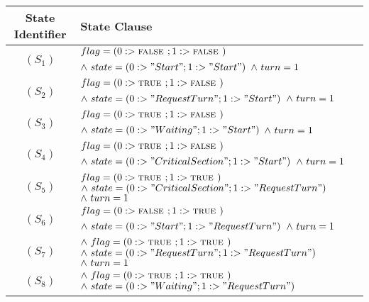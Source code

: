 \documentclass[fleqn]{tukseminar}
\begin{document}
				\begin{center}
					\begin{longtable}{ |c|p{10cm}| } 
						\hline
						\textbf{State Identifier} & \textbf{State Clause} \\
						\hline 
						\endhead
							\pa $(S_1)$  & $flag = (0 :> \mbox{\textsc{false }}  ;  1 :> \mbox{\textsc{false }})$\newline
													$\land \  state = (0 :> "Start"  ;  1 :> "Start")$\newline
													$\land \  turn = 1$\\
							\hline
							\pa $(S_2)$   & $flag = (0 :> \mbox{\textsc{true }}  ;  1 :> \mbox{\textsc{false }})$\newline
													$\land \  state = (0 :> "RequestTurn"  ;  1 :> "Start")$\newline
													$\land \  turn = 1$  \\ \hline
							\pa $(S_3)$   & $flag = (0 :> \mbox{\textsc{true }}  ;  1 :> \mbox{\textsc{false }})$\newline
													$\land \  state = (0 :> "Waiting"  ;  1 :> "Start")$\newline
													$\land \  turn = 1$  \\ \hline
							\pa $(S_4)$   & $ flag = (0 :> \mbox{\textsc{true }} ; 1 :> \mbox{\textsc{false }})$\newline
													$\land \  state = (0 :> "CriticalSection" ; 1 :> "Start")$\newline
													$\land \  turn = 1$  \\ \hline
							\pa $(S_5)$   & $ flag = (0 :> \mbox{\textsc{true }} ; 1 :> \mbox{\textsc{true }})$\newline
													$\land \  state = (0 :> "CriticalSection" ; 1 :> "RequestTurn")$\newline
													$\land \  turn = 1$  \\ \hline
							\pa $(S_6)$   & $ flag = (0 :> \mbox{\textsc{false }} ; 1 :> \mbox{\textsc{true }})$\newline
													$\land \  state = (0 :> "Start" ; 1 :> "RequestTurn")$\newline
													$\land \  turn = 1$  \\ \hline
							\pa $(S_7)$   & $\land \  flag = (0 :> \mbox{\textsc{true }} ; 1 :> \mbox{\textsc{true }})$\newline
													$\land \  state = (0 :> "RequestTurn" ; 1 :> "RequestTurn")$\newline
													$\land \  turn = 1$  \\ \hline
							\pa $(S_8)$   & $\land \  flag = (0 :> \mbox{\textsc{true }} ; 1 :> \mbox{\textsc{true }})$\newline
													$\land \  state = (0 :> "Waiting" ; 1 :> "RequestTurn")$\newline

\end{longtable}
\end{center}
\end{document}
